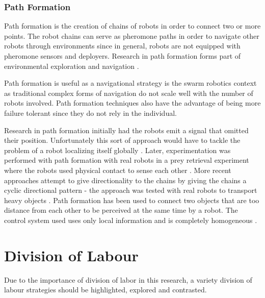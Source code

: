 \subsubsection{Path Formation}
Path formation is the creation of chains of robots in order to connect two or more points. The robot chains can serve as pheromone paths in order to navigate other robots through environments since in general, robots are not equipped with pheromone sensors and deployers. Research in path formation forms part of environmental exploration and navigation \cite{nouyan2006chain}.

Path formation is useful as a navigational strategy is the swarm robotics context as traditional complex forms of navigation do not scale well with the number of robots involved. Path formation techniques also have the advantage of being more failure tolerant since they do not rely in the individual.

Research in path formation initially had the robots emit a signal that omitted their position. Unfortunately this sort of approach would have to tackle the problem of a robot localizing itself globally \cite{goss1992harvesting}. Later, experimentation was performed with path formation with real robots in a prey retrieval experiment where the robots used physical contact to sense each other \cite{werger1996robotic}. More recent approaches attempt to give directionality to the chains by giving the chains a cyclic directional pattern - the approach was tested with real robots to transport heavy objects \cite{nouyan2006group}. Path formation has been used to connect two objects that are too distance from each other to be perceived at the same time by a robot. The control system used uses only local information and is completely homogeneous \cite{nouyan2006chain}.


\section{Division of Labour}
\label{chap:divisionoflabour}
Due to the importance of division of labor in this research, a variety division of labour strategies should be highlighted, explored and contrasted. 





